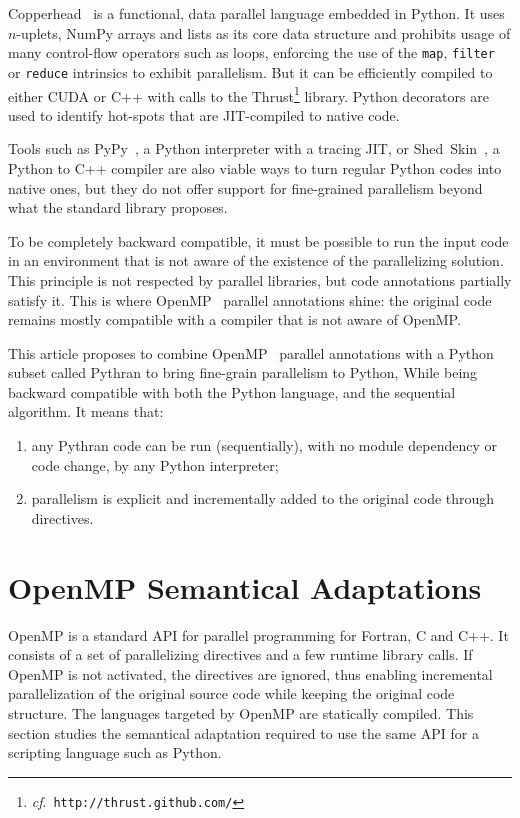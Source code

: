 \documentclass{sigplanconf}
\begin{document}
Copperhead~\cite{copperhead2011} is a functional, data parallel language
embedded in Python. It uses $n$-uplets, NumPy arrays and lists as its core data
structure and prohibits usage of many control-flow operators such as loops,
enforcing the use of the \texttt{map}, \texttt{filter} or \texttt{reduce}
intrinsics to exhibit parallelism. But it can be efficiently compiled to either
CUDA or C++ with calls to the Thrust\footnote{\emph{cf}.\
\texttt{http://thrust.github.com/}} library. Python decorators are used to
identify hot-spots that are JIT-compiled to native code.

Tools such as PyPy~\cite{pypy2009}, a Python interpreter with a tracing JIT, or
Shed~Skin~\cite{shedskin2006}, a Python to C++ compiler are also viable ways to
turn regular Python codes into native ones, but they do not offer support for
fine-grained parallelism beyond what the standard library proposes.

To be completely backward compatible, it must be possible to run the input code
in an environment that is not aware of the existence of the parallelizing
solution. This principle is not respected by parallel libraries, but code
annotations partially satisfy it. This is where OpenMP~\cite{openmp3.1} parallel
annotations shine: the original code remains mostly compatible with a compiler
that is not aware of OpenMP.

This article proposes to combine OpenMP~\cite{openmp3.1} parallel annotations
with a Python subset called Pythran to bring fine-grain parallelism to Python,
While being backward compatible with both the Python language, and the
sequential algorithm. It means that:
%
\begin{enumerate}
    \item any Pythran code can be run (sequentially), with no module dependency
        or code change, by any Python interpreter;
    \item parallelism is explicit and incrementally added to the original code
        through directives.
\end{enumerate}

\section{OpenMP Semantical Adaptations}\label{sec:python-openmp}

OpenMP is a standard API for parallel programming for Fortran, C and C++. It
consists of a set of parallelizing directives and a few runtime library calls.
If OpenMP is not activated, the directives are ignored, thus enabling
incremental parallelization of the original source code while keeping the
original code structure. The languages targeted by OpenMP are statically
compiled. This section studies the semantical adaptation required to use the
same API for a scripting language such as Python.
\end{document}
